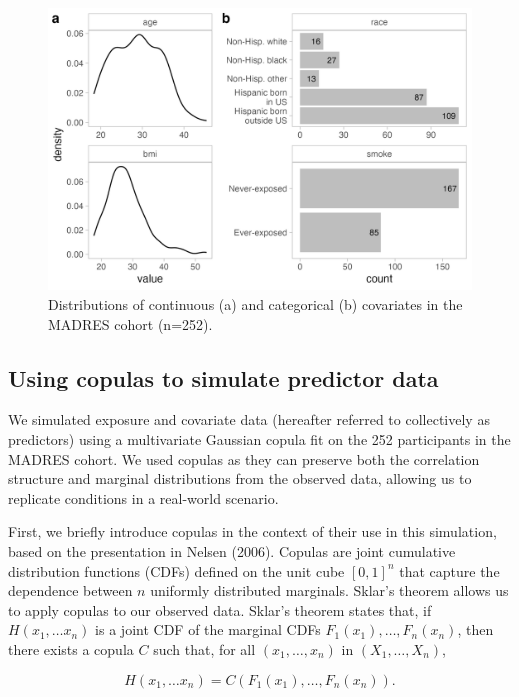 \documentclass[12pt, twoside]{amherstthesis}
\begin{document}
\begin{figure}

{\centering \includegraphics[width=0.75\linewidth]{figures/ch4_covdist} 

}

\caption{Distributions of continuous (a) and categorical (b) covariates in the MADRES cohort (n=252).}\label{fig:covdist}
\end{figure}
\hypertarget{copula}{%
\subsection{Using copulas to simulate predictor data}\label{copula}}

We simulated exposure and covariate data (hereafter referred to collectively as predictors) using a multivariate Gaussian copula fit on the 252 participants in the MADRES cohort. We used copulas as they can preserve both the correlation structure and marginal distributions from the observed data, allowing us to replicate conditions in a real-world scenario.

First, we briefly introduce copulas in the context of their use in this simulation, based on the presentation in Nelsen (2006). Copulas are joint cumulative distribution functions (CDFs) defined on the unit cube \([0,1]^n\) that capture the dependence between \(n\) uniformly distributed marginals. Sklar's theorem allows us to apply copulas to our observed data. Sklar's theorem states that, if \(H(x_1, \dots x_n)\) is a joint CDF of the marginal CDFs \(F_1(x_1), \dots, F_n(x_n)\), then there exists a copula \(C\) such that, for all \((x_1, \dots, x_n)\) in \((X_1, \dots, X_n)\),

\[
H(x_1, \dots x_n)=C(F_1(x_1), \dots, F_n(x_n)).
\]
\end{document}
